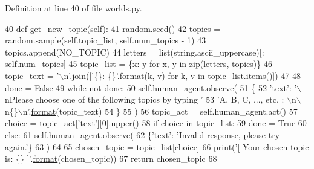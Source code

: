 Definition at line 40 of file worlds.\+py.


\begin{DoxyCode}
40     \textcolor{keyword}{def }get\_new\_topic(self):
41         random.seed()
42         topics = random.sample(self.topic\_list, self.num\_topics - 1)
43         topics.append(NO\_TOPIC)
44         letters = list(string.ascii\_uppercase)[: self.num\_topics]
45         topic\_list = \{x: y \textcolor{keywordflow}{for} x, y \textcolor{keywordflow}{in} zip(letters, topics)\}
46         topic\_text = \textcolor{stringliteral}{'\(\backslash\)n'}.join([\textcolor{stringliteral}{'\{\}: \{\}'}.\hyperlink{namespaceparlai_1_1chat__service_1_1services_1_1messenger_1_1shared__utils_a32e2e2022b824fbaf80c747160b52a76}{format}(k, v) \textcolor{keywordflow}{for} k, v \textcolor{keywordflow}{in} topic\_list.items()])
47 
48         done = \textcolor{keyword}{False}
49         \textcolor{keywordflow}{while} \textcolor{keywordflow}{not} done:
50             self.human\_agent.observe(
51                 \{
52                     \textcolor{stringliteral}{'text'}: \textcolor{stringliteral}{'\(\backslash\)nPlease choose one of the following topics by typing '}
53                     \textcolor{stringliteral}{'A, B, C, ..., etc. : \(\backslash\)n\(\backslash\)n\{\}\(\backslash\)n'}.\hyperlink{namespaceparlai_1_1chat__service_1_1services_1_1messenger_1_1shared__utils_a32e2e2022b824fbaf80c747160b52a76}{format}(topic\_text)
54                 \}
55             )
56             topic\_act = self.human\_agent.act()
57             choice = topic\_act[\textcolor{stringliteral}{'text'}][0].upper()
58             \textcolor{keywordflow}{if} choice \textcolor{keywordflow}{in} topic\_list:
59                 done = \textcolor{keyword}{True}
60             \textcolor{keywordflow}{else}:
61                 self.human\_agent.observe(
62                     \{\textcolor{stringliteral}{'text'}: \textcolor{stringliteral}{'Invalid response, please try again.'}\}
63                 )
64 
65         chosen\_topic = topic\_list[choice]
66         print(\textcolor{stringliteral}{'[ Your chosen topic is: \{\} ]'}.\hyperlink{namespaceparlai_1_1chat__service_1_1services_1_1messenger_1_1shared__utils_a32e2e2022b824fbaf80c747160b52a76}{format}(chosen\_topic))
67         \textcolor{keywordflow}{return} chosen\_topic
68 
\end{DoxyCode}
\mbox{\label{classparlai_1_1tasks_1_1wizard__of__wikipedia_1_1worlds_1_1InteractiveWorld_af4efe25e565dbf73a46d1559eb425243}} 
